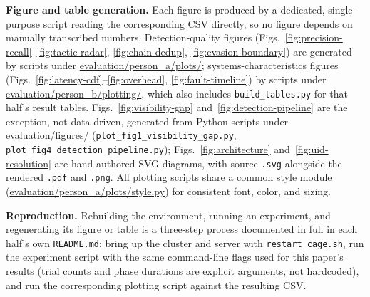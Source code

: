 \documentclass{ieeeaccess}
\begin{document}
\textbf{Figure and table generation.} Each figure is produced by a
dedicated, single-purpose script reading the corresponding CSV
directly, so no figure depends on manually transcribed numbers.
Detection-quality figures (Figs.~\ref{fig:precision-recall}--\ref{fig:tactic-radar}, \ref{fig:chain-dedup}, \ref{fig:evasion-boundary}) are generated by
scripts under \url{evaluation/person_a/plots/}; systems-characteristics
figures (Figs.~\ref{fig:latency-cdf}--\ref{fig:overhead}, \ref{fig:fault-timeline}) by scripts under
\url{evaluation/person_b/plotting/}, which also includes \texttt{build\_tables.py}
for that half's result tables. Figs.~\ref{fig:visibility-gap} and~\ref{fig:detection-pipeline} are the
exception, not data-driven, generated from Python scripts under
\url{evaluation/figures/} (\texttt{plot\_fig1\_visibility\_gap.py},
\texttt{plot\_fig4\_detection\_pipeline.py}); Figs.~\ref{fig:architecture}
and~\ref{fig:uid-resolution} are hand-authored SVG diagrams, with source
\texttt{.svg} alongside the rendered \texttt{.pdf} and \texttt{.png}. All plotting scripts
share a common style module (\url{evaluation/person_a/plots/style.py})
for consistent font, color, and sizing.

\textbf{Reproduction.} Rebuilding the environment, running an experiment,
and regenerating its figure or table is a three-step process
documented in full in each half's own \texttt{README.md}: bring up the
cluster and server with \texttt{restart\_cage.sh}, run the experiment script
with the same command-line flags used for this paper's results
(trial counts and phase durations are explicit arguments, not
hardcoded), and run the corresponding plotting script against the
resulting CSV.

\EOD
\end{document}
